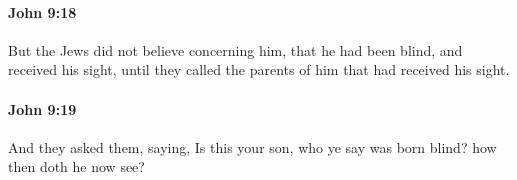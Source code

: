 		\paragraph{John 9:18} %
			\label{JOHN-9-18}

			But the Jews did not believe concerning him, that he had been blind, and received his sight, until they called the parents of him that had received his sight.

			\begin{framed}
			\scriptsize
				\begin{compactdesc}
					\item[SBLG] 
				\end{compactdesc}
			\end{framed}

		\paragraph{John 9:19} %
			\label{JOHN-9-19}

			And they asked them, saying, Is this your son, who ye say was born blind? how then doth he now see?

